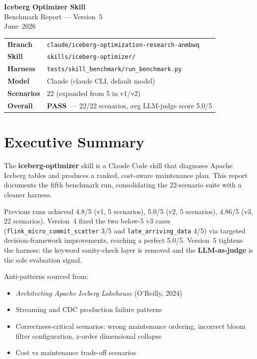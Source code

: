 \documentclass[11pt,a4paper]{article}
\newcommand{\pass}{\textcolor{passgreen}{\textbf{PASS}}}
\newcommand{\code}[1]{\texttt{#1}}
\begin{document}
\begin{titlepage}
  \centering
  \vspace*{3cm}
  {\LARGE\bfseries Iceberg Optimizer Skill}\\[0.4em]
  {\large Benchmark Report --- Version~5}\\[2em]
  {\large June~2026}\\[4em]
  \begin{tabular}{ll}
    \toprule
    \textbf{Branch}    & \code{claude/iceberg-optimization-research-anmbwq} \\
    \textbf{Skill}     & \code{skills/iceberg-optimizer/} \\
    \textbf{Harness}   & \code{tests/skill\_benchmark/run\_benchmark.py} \\
    \textbf{Model}     & Claude (claude CLI, default model) \\
    \textbf{Scenarios} & 22 (expanded from 5 in v1/v2) \\
    \textbf{Overall}   & \pass\ --- 22/22 scenarios, avg LLM-judge score 5.0/5 \\
    \bottomrule
  \end{tabular}
\end{titlepage}

\tableofcontents
\clearpage

\section{Executive Summary}

The \textbf{iceberg-optimizer} skill is a Claude Code skill that diagnoses
Apache Iceberg tables and produces a ranked, cost-aware maintenance plan.
This report documents the fifth benchmark run, consolidating the 22-scenario
suite with a cleaner harness.

Previous runs achieved 4.8/5 (v1, 5 scenarios), 5.0/5 (v2, 5 scenarios),
4.86/5 (v3, 22 scenarios).  Version~4 fixed the two below-5 v3 cases
(\code{flink\_micro\_commit\_scatter} 3/5 and \code{late\_arriving\_data} 4/5)
via targeted decision-framework improvements, reaching a perfect 5.0/5.
Version~5 tightens the harness: the keyword sanity-check layer is removed and
the \textbf{LLM-as-judge} is the sole evaluation signal.

Anti-patterns sourced from:
\begin{itemize}
  \item \emph{Architecting Apache Iceberg Lakehouse} (O'Reilly, 2024)
  \item Streaming and CDC production failure patterns
  \item Correctness-critical scenarios: wrong maintenance ordering, incorrect
        bloom filter configuration, z-order dimensional collapse
  \item Cost vs maintenance trade-off scenarios
\end{itemize}
\end{document}
